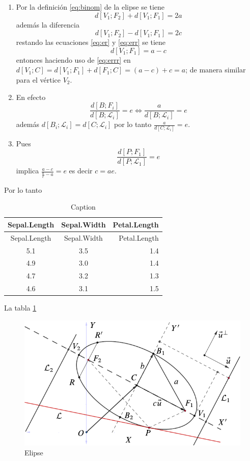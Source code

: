 \documentclass[10pt,]{krantz}
\let\oldincludegraphics\includegraphics
\renewcommand\includegraphics[2][]{%
  \oldincludegraphics[scale=0.85]{#2}
}
\theoremstyle{definition}
\theoremstyle{definition}
\theoremstyle{definition}
\theoremstyle{remark}
\begin{document}
\begin{enumerate}
\def\labelenumi{\arabic{enumi}.}
\setcounter{enumi}{1}
\item
  Por la definición \eqref{eq:binom} de la elipse se tiene
  \begin{equation}
  d\left[V_1;F_2\right]+d\left[V_1;F_1\right]=2a
  \label{eq:er}
  \end{equation}
  además la diferencia
  \begin{equation}
  d\left[V_1;F_2\right]-d\left[V_1;F_1\right]=2c
  \label{eq:err}
  \end{equation}
  restando las ecuaciones \eqref{eq:er} y \eqref{eq:err} se tiene
  \begin{equation}
  d\left[V_1;F_1\right]=a-c
  \label{eq:errr}
  \end{equation}
  entonces haciendo uso de \eqref{eq:errr} en \(d\left[V_1;C\right]=d\left[V_1;F_1\right]+d\left[F_1;C\right]=(a-c)+c=a\); de manera similar para el vértice \(V_2\).
\item
  En efecto \[\frac{d\left[B;F_i\right]}{d\left[B;\mathcal{L}_i\right]}=e\Longleftrightarrow \frac{a}{d\left[B;\mathcal{L}_i\right]}=e\] además \(d\left[B_i;\mathcal{L}_i\right]=d\left[C;\mathcal{L}_i\right]\) por lo tanto \(\frac{a}{d\left[C;\mathcal{L}_i\right]}=e\).
\item
  Pues \[\frac{d\left[P;F_1\right]}{d\left[P;\mathcal{L}_1\right]}=e\] implica \(\frac{a-c}{\frac{a}{e}-a}=e\) es decir \(c=ae\).
\end{enumerate}

Por lo tanto

\begin{longtable}[]{@{}ccr@{}}
\caption{\label{tab:ww} Caption}\tabularnewline
\toprule
Sepal.Length & Sepal.Width & Petal.Length\tabularnewline
\midrule
\endfirsthead
\toprule
Sepal.Length & Sepal.Width & Petal.Length\tabularnewline
\midrule
\endhead
5.1 & 3.5 & 1.4\tabularnewline
4.9 & 3.0 & 1.4\tabularnewline
4.7 & 3.2 & 1.3\tabularnewline
4.6 & 3.1 & 1.5\tabularnewline
\bottomrule
\end{longtable}

La tabla \ref{tab:ww}

\begin{figure}

{\centering \includegraphics{elipse} 

}

\caption{Elipse}\label{fig:f1}
\end{figure}
\end{document}
